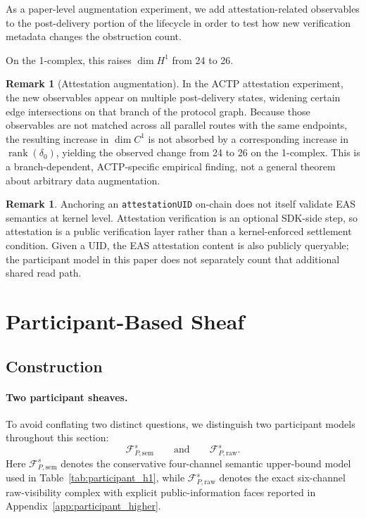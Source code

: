 \documentclass[11pt]{article}
\theoremstyle{plain}
\theoremstyle{definition}
\newtheorem{remark}[theorem]{Remark}
\newcommand{\Fsh}{\mathcal{F}}         %
\newcommand{\Cone}{C^{1}}
\newcommand{\Hone}{H^{1}}
\newcommand{\deltazero}{\delta_{0}}
\newcommand{\rank}{\operatorname{rank}}
\newcommand{\dimn}{\operatorname{dim}}
\begin{document}
As a paper-level augmentation experiment, we add attestation-related
observables to the post-delivery portion of the lifecycle in order to test how
new verification metadata changes the obstruction count.

On the 1-complex, this raises $\dimn\Hone$ from 24 to 26.

\begin{remark}[Attestation augmentation]\label{rmk:attestation_regression}
In the ACTP attestation experiment, the new observables appear on multiple
post-delivery states, widening certain edge intersections on that branch of
the protocol graph.  Because those observables are not matched across all
parallel routes with the same endpoints, the resulting increase in
$\dimn\Cone$ is not absorbed by a corresponding increase in
$\rank(\deltazero)$, yielding the observed change from 24 to 26 on the
1-complex.  This is a branch-dependent, ACTP-specific empirical finding,
not a general theorem about arbitrary data augmentation.
\end{remark}

\begin{remark}
Anchoring an \texttt{attestationUID} on-chain does not itself validate EAS
semantics at kernel level.  Attestation verification is an optional
SDK-side step, so attestation is a public verification layer rather than a
kernel-enforced settlement condition.  Given a UID, the EAS attestation
content is also publicly queryable; the participant model in this paper
does not separately count that additional shared read path.
\end{remark}

\section{Participant-Based Sheaf}
\label{sec:participant}

\subsection{Construction}
\label{sec:participant_construction}

\paragraph{Two participant sheaves.}
To avoid conflating two distinct questions, we distinguish two participant
models throughout this section:
\[
  \Fsh_{P,\mathrm{sem}}^s
  \qquad\text{and}\qquad
  \Fsh_{P,\mathrm{raw}}^s.
\]
Here $\Fsh_{P,\mathrm{sem}}^s$ denotes the conservative four-channel semantic
upper-bound model used in Table~\ref{tab:participant_h1}, while
$\Fsh_{P,\mathrm{raw}}^s$ denotes the exact six-channel raw-visibility complex
with explicit public-information faces reported in
Appendix~\ref{app:participant_higher}.
\end{document}
